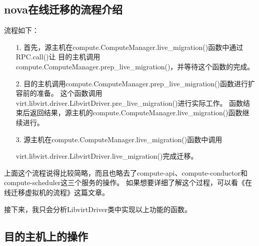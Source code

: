 \documentclass[a4paper,left=1.5cm,right=1.5cm,11pt]{article}
\begin{document}
\subsection{nova在线迁移的流程介绍}
	流程如下：
	\begin{itemize}
		\item[1.] 首先，源主机在compute.ComputeManager.live\_migration()函数中通过RPC.call()让
				  目的主机调用compute.ComputeManager.prep\_live\_migration()，并等待这个函数的完成。
		\item[2.] 目的主机调用compute.ComputeManager.prep\_live\_migration()函数进行扩容前的准备。
			      这个函数调用virt.libvirt.driver.LibvirtDriver.pre\_live\_migration()进行实际工作。
				  函数结束后返回结果，源主机的compute.ComputeManager.live\_migration()函数继续进行。
		\item[3.] 源主机在compute.ComputeManager.live\_migration()函数中调用\par
		virt.libvirt.driver.LibvirtDriver.live\_migration()完成迁移。
	\end{itemize}

	上面这个流程说得比较简略，而且也略去了compute-api、compute-conductor和compute-scheduler这三个服务的操作。
	如果想要详细了解这个过程，可以看《在线迁移虚拟机的流程》这篇文章。\par

	接下来，我只会分析LibvirtDriver类中实现以上功能的函数。

\subsection{目的主机上的操作}
\end{document}
